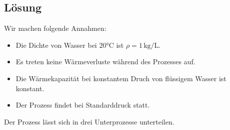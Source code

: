 \documentclass[german,12pt]{homework}
\newcommand{\sis}[1]{\,\si{#1}}
\newcommand{\degC}{\si{\degreeCelsius}}
\begin{document}
    \subsection*{Lösung} Wir machen folgende Annahmen:
    \begin{itemize}
        \item Die Dichte von Wasser bei \(20\degC\) ist \(\rho =
        1\sis{\kg\per\liter}\).
        \item Es treten keine Wärmeverluste während des Prozesses auf.
        \item Die Wärmekapazität bei konstantem Druch von flüssigem Wasser ist
        konstant.
        \item Der Prozess findet bei Standarddruck statt.
    \end{itemize}
    Der Prozess lässt sich in drei Unterprozesse unterteilen.
\end{document}
